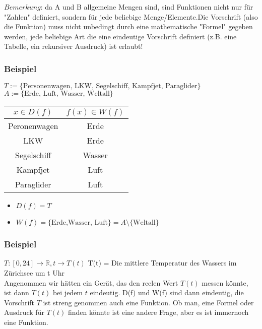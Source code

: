 \documentclass[11pt]{article} %
\begin{document}
$Bemerkung$: da A und B allgemeine Mengen sind, sind Funktionen nicht nur für "Zahlen" definiert, sondern für jede beliebige Menge/Elemente.Die Vorschrift (also die Funktion) muss nicht unbedingt durch eine mathematische "Formel" gegeben werden, jede beliebige Art die eine eindeutige Vorschrift definiert (z.B. eine Tabelle, ein rekursiver Ausdruck) ist erlaubt! 

\subsubsection{Beispiel}
$T := \{\textrm{Personenwagen, LKW, Segelschiff, Kampfjet, Paraglider}\}$\\
$A := \{\textrm{Erde, Luft, Wasser, Weltall}\}$
\begin{table}[h!]
    \begin{tabular}{|c|c|}
        \hline
        $x \in D(f)$          & $f(x) \in W(f)$ \\ \hline
        Peronenwagen & Erde   \\ 
        LKW          & Erde   \\ 
        Segelschiff  & Wasser \\ 
        Kampfjet     & Luft   \\ 
        Paraglider   & Luft   \\
        \hline
    \end{tabular}
\end{table}


\begin{itemize}
\item $D(f) = T$ 
\item $W(f) = \{\textrm{Erde,Wasser, Luft}\} = A \setminus \{\textrm{Weltall}\}$\\
\end{itemize}

\subsubsection{Beispiel}

$T: [0,24] \rightarrow \mathbb{R}, t \rightarrow T(t)$
T(t) = Die mittlere Temperatur des Wassers im Zürichsee um t Uhr \\

Angenommen wir hätten ein Gerät, das den reelen Wert $T(t)$ messen könnte, ist dann $T(t)$ bei jedem $t$ eindeutig. D(f) und W(f) sind dann eindeutig, die Vorschrift $T$ ist streng genommen auch eine Funktion. Ob man, eine Formel oder Ausdruck für $T(t)$ finden könnte ist eine andere Frage, aber es ist immernoch eine Funktion.\\
\end{document}
